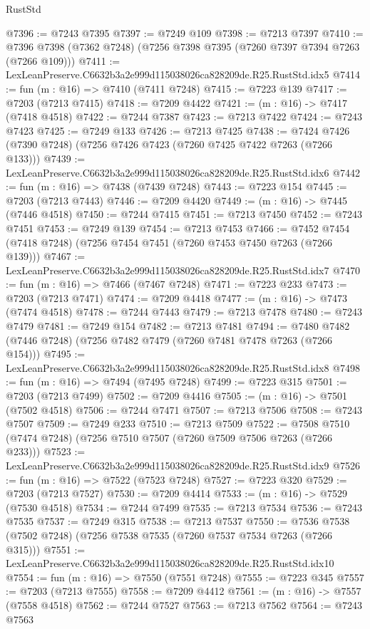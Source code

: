 \begin{lexlean}{RustStd}
\begin{coremodule}
@7396 := @7243 @7395
@7397 := @7249 @109
@7398 := @7213 @7397
@7410 := @7396 @7398 (@7362 @7248) (@7256 @7398 @7395 (@7260 @7397 @7394 @7263 (@7266 @109)))
@7411 := LexLeanPreserve.C6632b3a2e999d115038026ca828209de.R25.RustStd.idx5
@7414 := fun (m : @16) => @7410 (@7411 @7248)
@7415 := @7223 @139
@7417 := @7203 (@7213 @7415)
@7418 := @7209 @4422
@7421 := (m : @16) -> @7417 (@7418 @4518)
@7422 := @7244 @7387
@7423 := @7213 @7422
@7424 := @7243 @7423
@7425 := @7249 @133
@7426 := @7213 @7425
@7438 := @7424 @7426 (@7390 @7248) (@7256 @7426 @7423 (@7260 @7425 @7422 @7263 (@7266 @133)))
@7439 := LexLeanPreserve.C6632b3a2e999d115038026ca828209de.R25.RustStd.idx6
@7442 := fun (m : @16) => @7438 (@7439 @7248)
@7443 := @7223 @154
@7445 := @7203 (@7213 @7443)
@7446 := @7209 @4420
@7449 := (m : @16) -> @7445 (@7446 @4518)
@7450 := @7244 @7415
@7451 := @7213 @7450
@7452 := @7243 @7451
@7453 := @7249 @139
@7454 := @7213 @7453
@7466 := @7452 @7454 (@7418 @7248) (@7256 @7454 @7451 (@7260 @7453 @7450 @7263 (@7266 @139)))
@7467 := LexLeanPreserve.C6632b3a2e999d115038026ca828209de.R25.RustStd.idx7
@7470 := fun (m : @16) => @7466 (@7467 @7248)
@7471 := @7223 @233
@7473 := @7203 (@7213 @7471)
@7474 := @7209 @4418
@7477 := (m : @16) -> @7473 (@7474 @4518)
@7478 := @7244 @7443
@7479 := @7213 @7478
@7480 := @7243 @7479
@7481 := @7249 @154
@7482 := @7213 @7481
@7494 := @7480 @7482 (@7446 @7248) (@7256 @7482 @7479 (@7260 @7481 @7478 @7263 (@7266 @154)))
@7495 := LexLeanPreserve.C6632b3a2e999d115038026ca828209de.R25.RustStd.idx8
@7498 := fun (m : @16) => @7494 (@7495 @7248)
@7499 := @7223 @315
@7501 := @7203 (@7213 @7499)
@7502 := @7209 @4416
@7505 := (m : @16) -> @7501 (@7502 @4518)
@7506 := @7244 @7471
@7507 := @7213 @7506
@7508 := @7243 @7507
@7509 := @7249 @233
@7510 := @7213 @7509
@7522 := @7508 @7510 (@7474 @7248) (@7256 @7510 @7507 (@7260 @7509 @7506 @7263 (@7266 @233)))
@7523 := LexLeanPreserve.C6632b3a2e999d115038026ca828209de.R25.RustStd.idx9
@7526 := fun (m : @16) => @7522 (@7523 @7248)
@7527 := @7223 @320
@7529 := @7203 (@7213 @7527)
@7530 := @7209 @4414
@7533 := (m : @16) -> @7529 (@7530 @4518)
@7534 := @7244 @7499
@7535 := @7213 @7534
@7536 := @7243 @7535
@7537 := @7249 @315
@7538 := @7213 @7537
@7550 := @7536 @7538 (@7502 @7248) (@7256 @7538 @7535 (@7260 @7537 @7534 @7263 (@7266 @315)))
@7551 := LexLeanPreserve.C6632b3a2e999d115038026ca828209de.R25.RustStd.idx10
@7554 := fun (m : @16) => @7550 (@7551 @7248)
@7555 := @7223 @345
@7557 := @7203 (@7213 @7555)
@7558 := @7209 @4412
@7561 := (m : @16) -> @7557 (@7558 @4518)
@7562 := @7244 @7527
@7563 := @7213 @7562
@7564 := @7243 @7563

\end{coremodule}
\end{lexlean}
